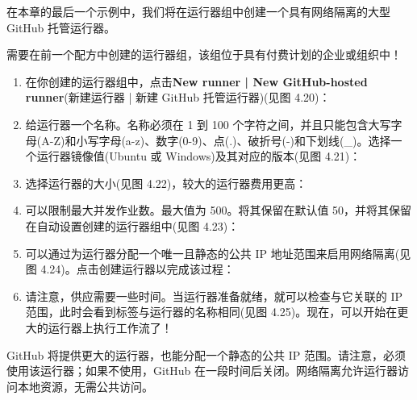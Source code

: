 在本章的最后一个示例中，我们将在运行器组中创建一个具有网络隔离的大型 GitHub 托管运行器。


需要在前一个配方中创建的运行器组，该组位于具有付费计划的企业或组织中！


\begin{enumerate}
\item 
在你创建的运行器组中，点击\textbf{New runner | New GitHub-hosted runner}(新建运行器 | 新建 GitHub 托管运行器)(见图 4.20)：


\item 
给运行器一个名称。名称必须在 1 到 100 个字符之间，并且只能包含大写字母(A-Z)和小写字母(a-z)、数字(0-9)、点(.)、破折号(-)和下划线(\_)。选择一个运行器镜像值(Ubuntu 或 Windows)及其对应的版本(见图 4.21)：


\item 
选择运行器的大小(见图 4.22)，较大的运行器费用更高：


\item 
可以限制最大并发作业数。最大值为 500。将其保留在默认值 50，并将其保留在自动设置创建的运行器组中(见图 4.23)：


\item 
可以通过为运行器分配一个唯一且静态的公共 IP 地址范围来启用网络隔离(见图 4.24)。点击创建运行器以完成该过程：


\item 
请注意，供应需要一些时间。当运行器准备就绪，就可以检查与它关联的 IP 范围，此时会看到标签与运行器的名称相同(见图 4.25)。现在，可以开始在更大的运行器上执行工作流了！


\end{enumerate}


GitHub 将提供更大的运行器，也能分配一个静态的公共 IP 范围。请注意，必须使用该运行器；如果不使用，GitHub 在一段时间后关闭。网络隔离允许运行器访问本地资源，无需公共访问。